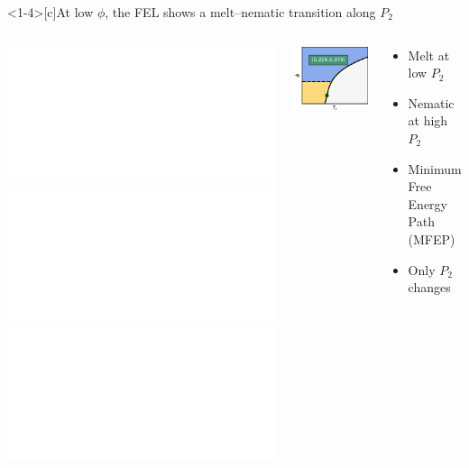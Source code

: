 \documentclass[aspectratio=169]{beamer}
\begin{document}
\begin{frame}<1-4>[c]{At low $\phi$, the FEL shows a melt--nematic transition along $P_{2}$}

  \begin{columns}[T]

    \centering
    \includegraphics<1>[]{../figures/fig-pathway_10p75/subfig-pathway_10p75.pdf}\includegraphics<2>[]{../figures/fig-pathway_10p75/fig-pathway_10p75_wConfs.pdf}\includegraphics<3->[]{../figures/fig-pathway_10p75/fig-pathway_10p75_wMFEP.pdf}

    \centering
    \includegraphics[]{figs/fig-phase_diag_mark_nematic.pdf}
    \vspace{-0.5\baselineskip}
    \begin{block}{}
      \begin{itemize}
        \item Melt at low $P_{2}$
        \item Nematic at high $P_{2}$
        \item<3-> {\color{yellow}{\rule{1cm}{0.1cm}} } Minimum Free Energy Path (MFEP)
        \item<4-> Only $P_{2}$ changes
      \end{itemize}
    \end{block}
     
  \end{columns}

  \par\leavevmode

\end{frame}
\end{document}
